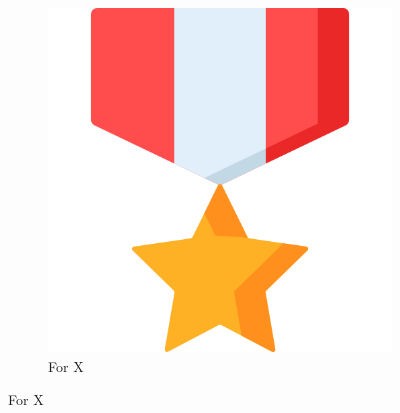 \documentclass[12 pct]{report}
\begin{document}
 \begin{figure}[H]
  \centering
  \begin{subfigure}[b]{0.3\linewidth}
    \includegraphics[width=\linewidth]{ArRobotCodeAchiv1}
     \caption{For X}
     

\end{subfigure}
\end{figure}
\end{document}
